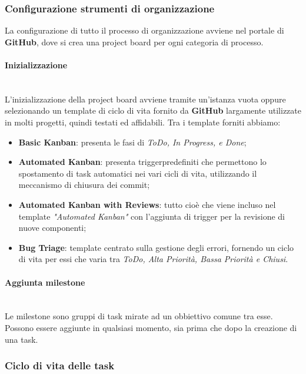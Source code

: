 \subsubsection{Configurazione strumenti di organizzazione}
	La configurazione di tutto il processo di organizzazione avviene nel portale di \textbf{GitHub}, dove si crea una project board per ogni categoria di processo. 	

\paragraph{Inizializzazione} \-\\
 L'inizializzazione della project board avviene tramite un'istanza vuota oppure selezionando un template di ciclo di vita fornito da \textbf{GitHub} largamente utilizzate in molti progetti, quindi testati ed affidabili. Tra i template forniti abbiamo: 

\begin{itemize}
		\item \textbf{Basic Kanban}: presenta le fasi di \textit{ToDo, In Progress, e Done}; 
		\item \textbf{Automated Kanban}: presenta trigger\glossario predefiniti che permettono lo spostamento di task
		 automatici nei vari cicli di vita, utilizzando il meccanismo di chiusura dei commit;
		\item \textbf{Automated Kanban with Reviews}: tutto cioè che viene incluso nel template \textit{"Automated Kanban"} con l'aggiunta di trigger per la revisione di nuove componenti; 
		\item \textbf{Bug Triage}: template centrato sulla gestione degli errori, fornendo un ciclo di vita per essi che varia tra \textit{ToDo, Alta Priorità, Bassa Priorità e Chiusi}. 
\end{itemize}
	  	
\paragraph{Aggiunta milestone} \-\\
	Le milestone sono gruppi di task mirate ad un obbiettivo comune tra esse.
	Possono essere aggiunte in qualsiasi momento, sia prima che dopo la creazione di una task.

\subsubsection{Ciclo di vita delle task}

